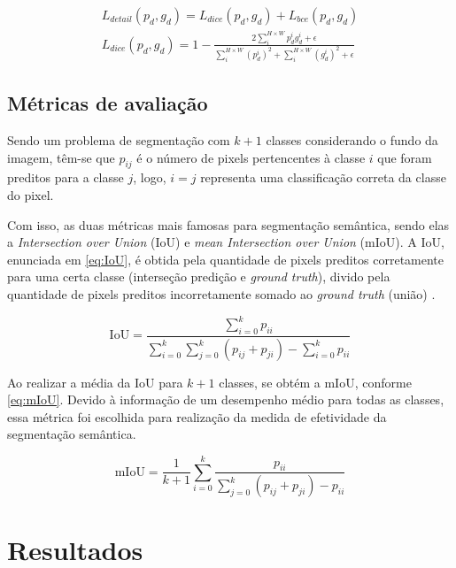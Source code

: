 \documentclass[conference]{IEEEtran}
\begin{document}
\begin{gather}
	L_{detail}(p_d,g_d) = L_{dice}(p_d, g_d) + L_{bce}(p_d, g_d) \label{eq:ldetail} \\ 
	L_{dice}(p_d, g_d) = 1 - \frac{2\sum_{i}^{H\times W}p_d^ig_d^i + \epsilon}{\sum_{i}^{H\times W}(p_d^i)^2 + \sum_{i}^{H\times W}(g_d^i)^2 + \epsilon}
	\label{eq:ldice}
\end{gather}


\subsection{Métricas de avaliação}

Sendo um problema de segmentação com $k +1$ classes considerando o fundo da imagem, têm-se que $p_{ij}$ é o número de pixels pertencentes à classe $i$ que foram preditos para a classe $j$, logo, $i = j$ representa uma classificação correta da classe do pixel.

Com isso, as duas métricas mais famosas para segmentação semântica, sendo elas a \textit{Intersection over Union} (IoU) e \textit{mean Intersection over Union} (mIoU). A IoU, enunciada em \eqref{eq:IoU}, é obtida pela quantidade de pixels preditos corretamente para uma certa classe (interseção predição e \textit{ground truth}), divido pela quantidade de pixels preditos incorretamente somado ao \textit{ground truth} (união) \cite{papadeas2021RealTimeSemanticImage}. 

\begin{equation}\label{eq:IoU}
	\text{IoU} = \frac{\sum_{i=0}^{k}p_{ii}}{\sum_{i=0}^{k}\sum_{j=0}^{k}\left(p_{ij} + p_{ji}\right) - \sum_{i=0}^{k}p_{ii}}
\end{equation}

Ao realizar a média da IoU para $k+1$ classes, se obtém a mIoU, conforme \eqref{eq:mIoU}. Devido à informação de um desempenho médio para todas as classes, essa métrica foi escolhida para realização da medida de efetividade da segmentação semântica.

\begin{equation}\label{eq:mIoU}
	\text{mIoU} = \frac{1}{k+1} \sum_{i = 0}^{k}\frac{p_{ii}}{\sum_{j=0}^{k}\left(p_{ij} + p_{ji}\right) - p_{ii}}
\end{equation}



\section{Resultados}  \label{sc:resultados}
\end{document}
